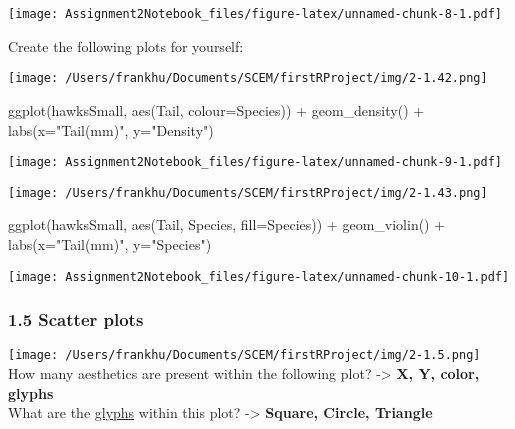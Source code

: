 \documentclass[
]{article}
\newenvironment{Shaded}{\begin{snugshade}}{\end{snugshade}}
\newcommand{\AttributeTok}[1]{\textcolor[rgb]{0.77,0.63,0.00}{#1}}
\newcommand{\FunctionTok}[1]{\textcolor[rgb]{0.00,0.00,0.00}{#1}}
\newcommand{\NormalTok}[1]{#1}
\newcommand{\SpecialCharTok}[1]{\textcolor[rgb]{0.00,0.00,0.00}{#1}}
\newcommand{\StringTok}[1]{\textcolor[rgb]{0.31,0.60,0.02}{#1}}
\begin{document}
\texttt{[image: Assignment2Notebook\_files/figure-latex/unnamed-chunk-8-1.pdf]}

Create the following plots for yourself:

\texttt{[image: /Users/frankhu/Documents/SCEM/firstRProject/img/2-1.42.png]}

\begin{Shaded}
\begin{Highlighting}[]
\FunctionTok{ggplot}\NormalTok{(hawksSmall, }\FunctionTok{aes}\NormalTok{(Tail, }\AttributeTok{colour=}\NormalTok{Species)) }\SpecialCharTok{+} \FunctionTok{geom\_density}\NormalTok{() }\SpecialCharTok{+} \FunctionTok{labs}\NormalTok{(}\AttributeTok{x=}\StringTok{"Tail(mm)"}\NormalTok{, }\AttributeTok{y=}\StringTok{"Density"}\NormalTok{)}
\end{Highlighting}
\end{Shaded}

\texttt{[image: Assignment2Notebook\_files/figure-latex/unnamed-chunk-9-1.pdf]}

\texttt{[image: /Users/frankhu/Documents/SCEM/firstRProject/img/2-1.43.png]}

\begin{Shaded}
\begin{Highlighting}[]
\FunctionTok{ggplot}\NormalTok{(hawksSmall, }\FunctionTok{aes}\NormalTok{(Tail, Species, }\AttributeTok{fill=}\NormalTok{Species)) }\SpecialCharTok{+} \FunctionTok{geom\_violin}\NormalTok{() }\SpecialCharTok{+} \FunctionTok{labs}\NormalTok{(}\AttributeTok{x=}\StringTok{"Tail(mm)"}\NormalTok{, }\AttributeTok{y=}\StringTok{"Species"}\NormalTok{)}
\end{Highlighting}
\end{Shaded}

\texttt{[image: Assignment2Notebook\_files/figure-latex/unnamed-chunk-10-1.pdf]}

\hypertarget{scatter-plots}{%
\subsubsection{1.5 Scatter plots}\label{scatter-plots}}

\texttt{[image: /Users/frankhu/Documents/SCEM/firstRProject/img/2-1.5.png]}
How many aesthetics are present within the following plot?
-\textgreater{} \textbf{X, Y, color, glyphs}\\
What are the
\href{https://en.wikipedia.org/wiki/Glyph_(data_visualization)}{glyphs}
within this plot? -\textgreater{} \textbf{Square, Circle, Triangle}
\end{document}
